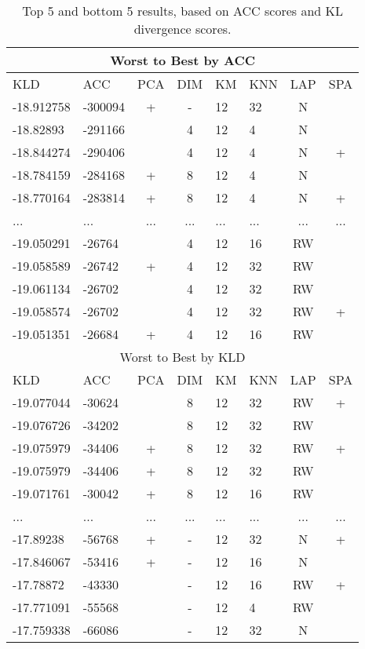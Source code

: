 \documentclass{article}
\begin{document}
\begin{table}[ht]
    \centering
    \begin{tabular}{|l|l|c|c|l|l|c|c}
    \multicolumn{8}{c}{Worst to Best by ACC} \\\hline
    KLD & ACC & PCA & DIM & KM & KNN & LAP & SPA \\\hline
    -18.912758 & -300094 & + & - & 12 & 32 & N & \\
    -18.82893 & -291166 &  & 4 & 12 & 4 & N & \\
    -18.844274 & -290406 &  & 4 & 12 & 4 & N & +\\
    -18.784159 & -284168 & + & 8 & 12 & 4 & N & \\
    -18.770164 & -283814 & + & 8 & 12 & 4 & N & +\\
    ... & ... & ... & ... & ... & ... & ... & ...\\
    -19.050291 & -26764 &  & 4 & 12 & 16 & RW & \\
    -19.058589 & -26742 & + & 4 & 12 & 32 & RW & \\
    -19.061134 & -26702 &  & 4 & 12 & 32 & RW & \\
    -19.058574 & -26702 &  & 4 & 12 & 32 & RW & +\\
    -19.051351 & -26684 & + & 4 & 12 & 16 & RW & \\
    \multicolumn{8}{c}{Worst to Best by KLD} \\\hline
    KLD & ACC & PCA & DIM & KM & KNN & LAP & SPA \\\hline
    -19.077044 & -30624 &  & 8 & 12 & 32 & RW & +\\
    -19.076726 & -34202 &  & 8 & 12 & 32 & RW & \\
    -19.075979 & -34406 & + & 8 & 12 & 32 & RW & +\\
    -19.075979 & -34406 & + & 8 & 12 & 32 & RW & \\
    -19.071761 & -30042 & + & 8 & 12 & 16 & RW & \\
    ... & ... & ... & ... & ... & ... & ... & ...\\
    -17.89238 & -56768 & + & - & 12 & 32 & N & +\\
    -17.846067 & -53416 & + & - & 12 & 16 & N & \\
    -17.78872 & -43330 &  & - & 12 & 16 & RW & +\\
    -17.771091 & -55568 &  & - & 12 & 4 & RW & \\
    -17.759338 & -66086 &  & - & 12 & 32 & N & \\
    \end{tabular}
    \caption{Top 5 and bottom 5 results, based on ACC scores and KL divergence scores. \label{tab:ress}}
\end{table}
\end{document}
